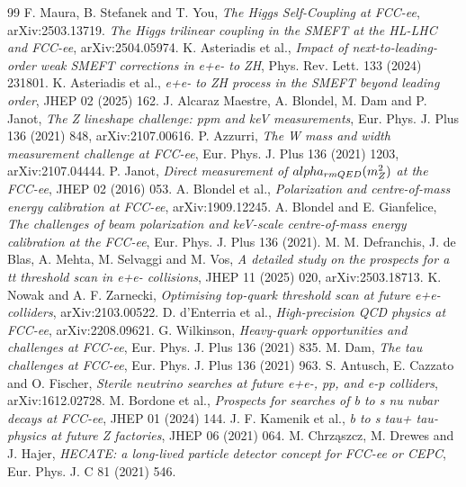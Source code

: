 \documentclass[11pt,a4paper]{article}
\numberwithin{equation}{section}
\begin{document}
\begin{thebibliography}{99}
 F. Maura, B. Stefanek and T. You, \emph{The Higgs Self-Coupling at FCC-ee}, arXiv:2503.13719.
 \emph{The Higgs trilinear coupling in the SMEFT at the HL-LHC and FCC-ee}, arXiv:2504.05974.
 K. Asteriadis et al., \emph{Impact of next-to-leading-order weak SMEFT corrections in e+e- to ZH}, Phys. Rev. Lett. 133 (2024) 231801.
 K. Asteriadis et al., \emph{e+e- to ZH process in the SMEFT beyond leading order}, JHEP 02 (2025) 162.
 J. Alcaraz Maestre, A. Blondel, M. Dam and P. Janot, \emph{The Z lineshape challenge: ppm and keV measurements}, Eur. Phys. J. Plus 136 (2021) 848, arXiv:2107.00616.
 P. Azzurri, \emph{The W mass and width measurement challenge at FCC-ee}, Eur. Phys. J. Plus 136 (2021) 1203, arXiv:2107.04444.
 P. Janot, \emph{Direct measurement of $\\alpha_{\\rm QED}(m_Z^2)$ at the FCC-ee}, JHEP 02 (2016) 053.
 A. Blondel et al., \emph{Polarization and centre-of-mass energy calibration at FCC-ee}, arXiv:1909.12245.
 A. Blondel and E. Gianfelice, \emph{The challenges of beam polarization and keV-scale centre-of-mass energy calibration at the FCC-ee}, Eur. Phys. J. Plus 136 (2021).
 M. M. Defranchis, J. de Blas, A. Mehta, M. Selvaggi and M. Vos, \emph{A detailed study on the prospects for a tt threshold scan in e+e- collisions}, JHEP 11 (2025) 020, arXiv:2503.18713.
 K. Nowak and A. F. Zarnecki, \emph{Optimising top-quark threshold scan at future e+e- colliders}, arXiv:2103.00522.
 D. d'Enterria et al., \emph{High-precision QCD physics at FCC-ee}, arXiv:2208.09621.
 G. Wilkinson, \emph{Heavy-quark opportunities and challenges at FCC-ee}, Eur. Phys. J. Plus 136 (2021) 835.
 M. Dam, \emph{The tau challenges at FCC-ee}, Eur. Phys. J. Plus 136 (2021) 963.
 S. Antusch, E. Cazzato and O. Fischer, \emph{Sterile neutrino searches at future e+e-, pp, and e-p colliders}, arXiv:1612.02728.
 M. Bordone et al., \emph{Prospects for searches of b to s nu nubar decays at FCC-ee}, JHEP 01 (2024) 144.
 J. F. Kamenik et al., \emph{b to s tau+ tau- physics at future Z factories}, JHEP 06 (2021) 064.
 M. Chrz\k{a}szcz, M. Drewes and J. Hajer, \emph{HECATE: a long-lived particle detector concept for FCC-ee or CEPC}, Eur. Phys. J. C 81 (2021) 546.

\end{thebibliography}
\end{document}
